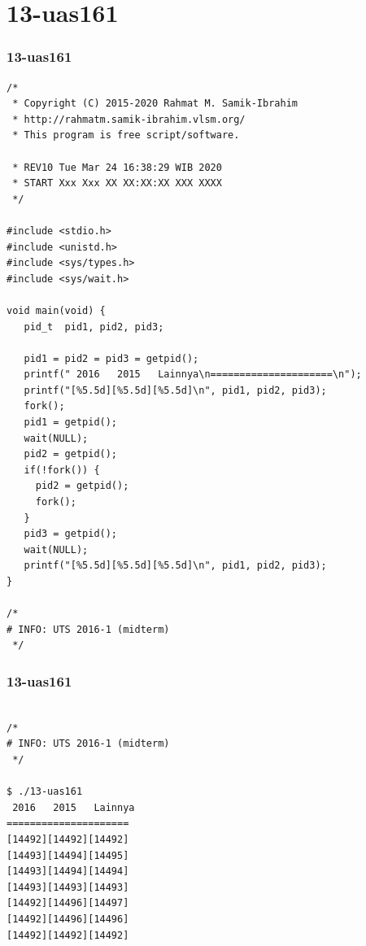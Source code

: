 \documentclass[xcolor=table, notheorems, hyperref={pdfpagelabels=false}]{beamer}
\begin{document}
\section{13-uas161}
\begin{frame}[fragile]
\frametitle{13-uas161}
\begin{lstlisting}[basicstyle=\ttfamily\tiny]
/*
 * Copyright (C) 2015-2020 Rahmat M. Samik-Ibrahim
 * http://rahmatm.samik-ibrahim.vlsm.org/
 * This program is free script/software.

 * REV10 Tue Mar 24 16:38:29 WIB 2020
 * START Xxx Xxx XX XX:XX:XX XXX XXXX
 */

#include <stdio.h>
#include <unistd.h>
#include <sys/types.h>
#include <sys/wait.h>

void main(void) {
   pid_t  pid1, pid2, pid3;

   pid1 = pid2 = pid3 = getpid();
   printf(" 2016   2015   Lainnya\n=====================\n");
   printf("[%5.5d][%5.5d][%5.5d]\n", pid1, pid2, pid3);
   fork(); 
   pid1 = getpid();
   wait(NULL);
   pid2 = getpid();
   if(!fork()) {
     pid2 = getpid();
     fork();
   }
   pid3 = getpid();
   wait(NULL);
   printf("[%5.5d][%5.5d][%5.5d]\n", pid1, pid2, pid3);
}

/*
# INFO: UTS 2016-1 (midterm)
 */

\end{lstlisting}
\end{frame}

\begin{frame}[fragile]
\frametitle{13-uas161}
\begin{lstlisting}[basicstyle=\ttfamily\large]        %  54

/*
# INFO: UTS 2016-1 (midterm)
 */

$ ./13-uas161 
 2016   2015   Lainnya
=====================
[14492][14492][14492]
[14493][14494][14495]
[14493][14494][14494]
[14493][14493][14493]
[14492][14496][14497]
[14492][14496][14496]
[14492][14492][14492]

\end{lstlisting}
\end{frame}
\end{document}
